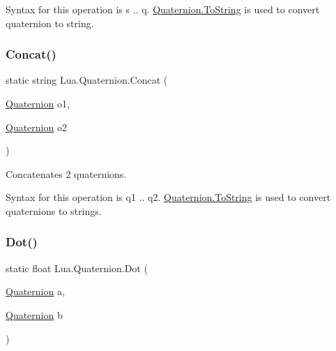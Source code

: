 Syntax for this operation is {\ttfamily s .. q}. \mbox{\hyperlink{class_lua_1_1_quaternion_a72a4b219c3442e088c7ee963feb1b372}{Quaternion.\+To\+String}} is used to convert quaternion to string. \mbox{\label{class_lua_1_1_quaternion_aef26c0eb5e338baa7dc1a87530b360d1}} 
\subsubsection{\texorpdfstring{Concat()}{Concat()}\hspace{0.1cm}{\footnotesize\ttfamily [3/3]}}
{\footnotesize\ttfamily static string Lua.\+Quaternion.\+Concat (\begin{DoxyParamCaption}\item[{\mbox{\hyperlink{class_lua_1_1_quaternion}{Quaternion}}}]{o1,  }\item[{\mbox{\hyperlink{class_lua_1_1_quaternion}{Quaternion}}}]{o2 }\end{DoxyParamCaption})\hspace{0.3cm}{\ttfamily [static]}}



Concatenates 2 quaternions. 

Syntax for this operation is {\ttfamily q1 .. q2}. \mbox{\hyperlink{class_lua_1_1_quaternion_a72a4b219c3442e088c7ee963feb1b372}{Quaternion.\+To\+String}} is used to convert quaternions to strings. \mbox{\label{class_lua_1_1_quaternion_a8479fc724c544d8784afeae5778e6a27}} 
\subsubsection{\texorpdfstring{Dot()}{Dot()}}
{\footnotesize\ttfamily static float Lua.\+Quaternion.\+Dot (\begin{DoxyParamCaption}\item[{\mbox{\hyperlink{class_lua_1_1_quaternion}{Quaternion}}}]{a,  }\item[{\mbox{\hyperlink{class_lua_1_1_quaternion}{Quaternion}}}]{b }\end{DoxyParamCaption})\hspace{0.3cm}{\ttfamily [static]}}



